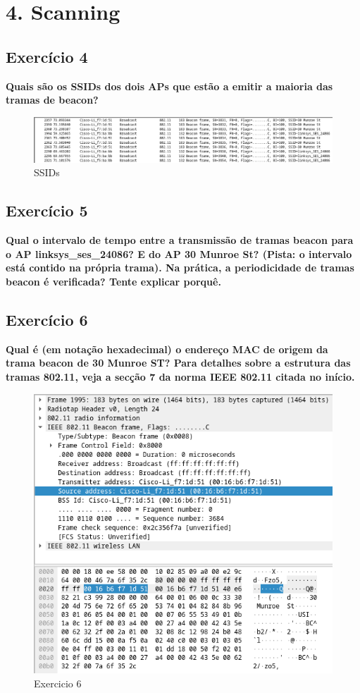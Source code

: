\documentclass[a4paper]{report}
\begin{document}
\chapter{4. Scanning}
\section{Exercício 4}
\textbf{Quais são os SSIDs dos dois APs que estão a emitir a maioria das tramas
    de beacon?}
\begin{figure}[H]
    \centering 
    \includegraphics[width=\textwidth]{images/ex4SSIDS.png}  
    \caption{SSIDs}
    \label{fig:SSIDs}
\end{figure}

\section{Exercício 5}
\textbf{Qual o intervalo de tempo entre a transmissão de tramas beacon para o AP
    linksys\_ses\_24086? E do AP 30 Munroe St? (Pista: o intervalo está contido na
    própria trama). Na prática, a periodicidade de tramas beacon é verificada?
    Tente explicar porquê.}

\section{Exercício 6}
\textbf{Qual é (em notação hexadecimal) o endereço MAC de origem da trama beacon
    de 30 Munroe ST? Para detalhes sobre a estrutura das tramas 802.11, veja a
    secção 7 da norma IEEE 802.11 citada no início.}

\begin{figure}[H]
    \centering 
    \includegraphics[width=\textwidth]{images/ex6.png}  
    \caption{Exercicio 6}
    \label{fig:ex6}
\end{figure}
\end{document}

